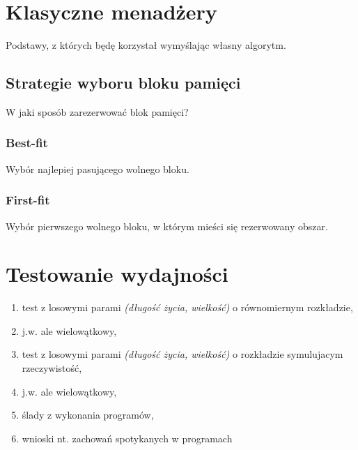 \documentclass[12pt,a4paper,titlepage,twoside]{mwart}
\begin{document}
\newpage


\section{Klasyczne menadżery}
\hypertarget{Klasyka}{}

Podstawy, z których będę korzystał wymyślając własny algorytm.

\subsection{Strategie wyboru bloku pamięci}

W jaki sposób zarezerwować blok pamięci?

\subsubsection{Best-fit}

Wybór najlepiej pasującego wolnego bloku.

\subsubsection{First-fit}

Wybór pierwszego wolnego bloku, w którym mieści się rezerwowany obszar.

\newpage


\section{Testowanie wydajności}
\hypertarget{Testowanie}{}

\begin{enumerate}
\item test z losowymi parami \textit{(długość życia, wielkość)} o równomiernym rozkładzie,
\item j.w. ale wielowątkowy,
\item test z losowymi parami \textit{(długość życia, wielkość)} o rozkładzie symulujacym rzeczywistość,
\item j.w. ale wielowątkowy,
\item ślady z wykonania programów,
\item wnioski nt. zachowań spotykanych w programach
\end{enumerate}
\end{document}
